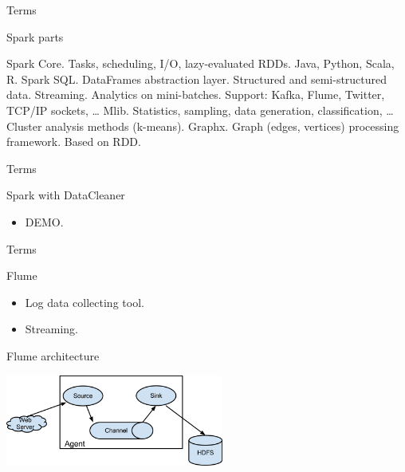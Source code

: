 \begin{frame}{Terms}
  \begin{block}{Spark parts}
    \begin{outline}
      \1 Spark Core.
        \2 Tasks, scheduling, I/O, lazy-evaluated RDDs.
        \2 Java, Python, Scala, R.
      \1 Spark SQL.
        \2 DataFrames abstraction layer.
        \2 Structured and semi-structured data.
      \1 Streaming.
        \2 Analytics on mini-batches.
        \2 Support: Kafka, Flume, Twitter, TCP/IP sockets, \dots
      \1 Mlib.
        \2 Statistics, sampling, data generation, classification, \dots
        \2 Cluster analysis methods (k-means).
      \1 Graphx. 
        \2 Graph (edges, vertices) processing framework.
        \2 Based on RDD.
    \end{outline}
  \end{block}
\end{frame}

\begin{frame}{Terms}
  \begin{block}{Spark with DataCleaner}
    \begin{itemize}
      \item DEMO. 
    \end{itemize}
  \end{block}
\end{frame}

\begin{frame}{Terms}
  \begin{block}{Flume}
    \begin{itemize}
      \item Log data collecting tool.
      \item Streaming.
    \end{itemize}
  \end{block}
  \begin{block}{Flume architecture}
    \begin{center}
      \includegraphics[height=3cm]{img/flume.png}
    \end{center}
  \end{block}
\end{frame}

